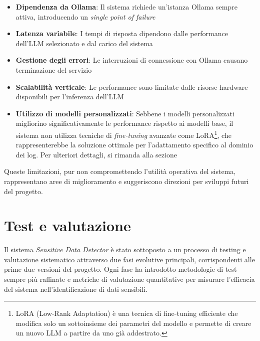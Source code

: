\documentclass[12pt]{report}
\begin{document}
\begin{itemize}
    \item \textbf{Dipendenza da Ollama}: Il sistema richiede un'istanza Ollama sempre attiva, introducendo un \textit{single point of failure}
    \item \textbf{Latenza variabile}: I tempi di risposta dipendono dalle performance dell'LLM selezionato e dal carico del sistema
    \item \textbf{Gestione degli errori}: Le interruzioni di connessione con Ollama causano terminazione del servizio
    \item \textbf{Scalabilità verticale}: Le performance sono limitate dalle risorse hardware disponibili per l'inferenza dell'LLM
    \item \textbf{Utilizzo di modelli personalizzati}: Sebbene i modelli personalizzati migliorino significativamente le performance rispetto ai modelli base, il sistema non utilizza tecniche di \textit{fine-tuning} avanzate come LoRA\footnote{LoRA (Low-Rank Adaptation) è una tecnica di fine-tuning efficiente che modifica solo un sottoinsieme dei parametri del modello e permette di creare un nuovo LLM a partire da uno già addestrato.}, che rappresenterebbe la soluzione ottimale per l'adattamento specifico al dominio dei log. Per ulteriori dettagli, si rimanda alla sezione 
\end{itemize}

Queste limitazioni, pur non compromettendo l'utilità operativa del sistema, rappresentano aree di miglioramento e suggeriscono direzioni per sviluppi futuri del progetto.



%
%

\chapter{Test e valutazione}
\label{chap:test}

Il sistema \textit{Sensitive Data Detector} è stato sottoposto a un processo di testing e valutazione sistematico attraverso due fasi evolutive principali, corrispondenti alle prime due versioni del progetto. Ogni fase ha introdotto metodologie di test sempre più raffinate e metriche di valutazione quantitative per misurare l'efficacia del sistema nell'identificazione di dati sensibili.
\end{document}
